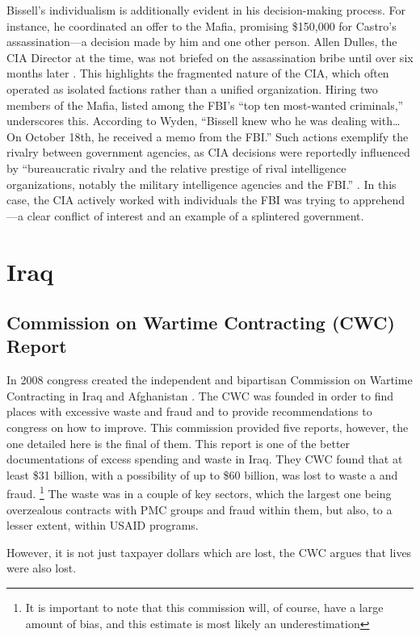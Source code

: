 \documentclass{article}
\begin{document}
    Bissell's individualism is additionally evident in his decision-making process. For instance, he coordinated an offer to the Mafia, promising \$150,000 for Castro's assassination—a decision made by him and one other person.  Allen Dulles, the CIA Director at the time, was not briefed on the assassination bribe until over six months later \cite{Wyden1979}. This highlights the fragmented nature of the CIA, which often operated as isolated factions rather than a unified organization. Hiring two members of the Mafia, listed among the FBI's “top ten most-wanted criminals,” underscores this. According to Wyden, “Bissell knew who he was dealing with… On October 18th, he received a memo from the FBI.” Such actions exemplify the rivalry between government agencies, as CIA decisions were reportedly influenced by “bureaucratic rivalry and the relative prestige of rival intelligence organizations, notably the military intelligence agencies and the FBI.” \cite{JeffreysJones2003}. In this case, the CIA actively worked with individuals the FBI was trying to apprehend—a clear conflict of interest and an example of a splintered government.
\section{Iraq}
    \subsection{Commission on Wartime Contracting (CWC) Report}
        In 2008 congress created the independent and bipartisan Commission on Wartime Contracting in Iraq and Afghanistan \cite{CWC_2011}. The CWC was founded in order to find places with excessive waste and fraud and to provide recommendations to congress on how to improve. This commission provided five reports, however, the one detailed here is the final of them. This report is one of the better documentations of excess spending and waste in Iraq. They CWC found that at least \$31 billion, with a possibility of up to \$60 billion, was lost to waste a and fraud. \footnote{It is important to note that this commission will, of course, have a large amount of bias, and this estimate is most likely an underestimation} The waste was in a couple of key sectors, which the largest one being overzealous contracts with PMC groups and fraud within them, but also, to a lesser extent, within USAID programs.

        However, it is not just taxpayer dollars which are lost, the CWC argues that lives were also lost. 
\end{document}
